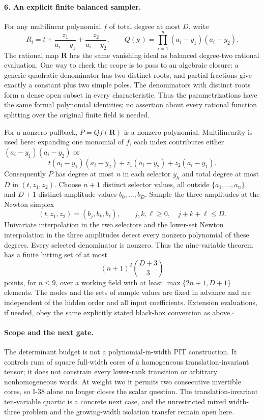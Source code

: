 \paragraph{6. An explicit finite balanced sampler.}
For any multilinear polynomial $f$ of total degree at most $D$,
write
\[
 R_i=t+\frac{z_1}{a_i-y_1}+\frac{z_2}{a_i-y_2},
 \qquad
 Q(\mathbf y)=\prod_{i=1}^n(a_i-y_1)(a_i-y_2).
 \tag{I.129}
\]
The rational map $\mathbf R$ has the same vanishing ideal as
balanced degree-two rational evaluation. One way to check the
scope is to pass to an algebraic closure: a generic quadratic
denominator has two distinct roots, and partial fractions give
exactly a constant plus two simple poles. The denominators with
distinct roots form a dense open subset in every characteristic.
Thus the parametrizations have the same formal polynomial
identities; no assertion about every rational function splitting
over the original finite field is needed.

For a nonzero pullback, $P=Qf(\mathbf R)$ is a nonzero polynomial.
Multilinearity is used here: expanding one monomial of $f$,
each index contributes either $(a_i-y_1)(a_i-y_2)$ or
\[
 t(a_i-y_1)(a_i-y_2)+z_1(a_i-y_2)+z_2(a_i-y_1).
\]
Consequently $P$ has degree at most $n$ in each selector $y_h$
and total degree at most $D$ in $(t,z_1,z_2)$. Choose $n+1$
distinct selector values, all outside $\{a_1,\ldots,a_n\}$,
and $D+1$ distinct amplitude values $b_0,\ldots,b_D$.
Sample the three amplitudes at the Newton simplex
\[
 (t,z_1,z_2)=(b_j,b_k,b_\ell),\qquad
               j,k,\ell\ge0,\quad j+k+\ell\le D.
\]
Univariate interpolation in the two selectors and the lower-set
Newton interpolation in the three amplitudes detect every
nonzero polynomial of these degrees. Every selected denominator
is nonzero. Thus the nine-variable theorem has a finite hitting
set of at most
\[
 (n+1)^2\binom{D+3}{3}
 \tag{I.130}
\]
points, for $n\le9$, over a working field with at least
$\max\{2n+1,D+1\}$ elements. The nodes and the sets of sample
values are fixed in advance and are independent of the hidden
order and all input coefficients. Extension evaluations, if
needed, obey the same explicitly stated black-box convention
as above.\hfill$\square$

\paragraph{Scope and the next gate.}
The determinant budget is not a polynomial-in-width PIT
construction. It controls runs of square full-width cores of a
homogeneous translation-invariant tensor; it does not constrain
every lower-rank transition or arbitrary nonhomogeneous words.
At weight two it permits two consecutive invertible cores, so
I-38 alone no longer closes the scalar question. The
translation-invariant ten-variable quartic is a concrete next
case, and the unrestricted mixed width-three problem and the
growing-width isolation transfer remain open here.


